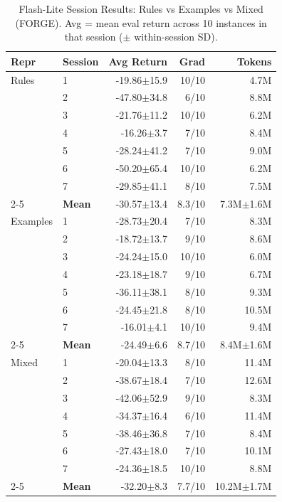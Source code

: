 \documentclass[sigconf]{acmart}
\begin{document}
\begin{table}[htbp]
\centering
\scriptsize
\caption{Flash-Lite Session Results: Rules vs Examples vs Mixed (FORGE).
Avg = mean eval return across 10 instances in that session ($\pm$ within-session SD).}
\label{tab:flash-lite-7run}
\begin{tabular}{ll rrr}
\toprule
\textbf{Repr} & \textbf{Session} & \textbf{Avg Return} & \textbf{Grad} & \textbf{Tokens} \\
\midrule
Rules & 1 & -19.86$\pm$15.9 & 10/10 & 4.7M \\
 & 2 & -47.80$\pm$34.8 & 6/10 & 8.8M \\
 & 3 & -21.76$\pm$11.2 & 10/10 & 6.2M \\
 & 4 & -16.26$\pm$3.7 & 7/10 & 8.4M \\
 & 5 & -28.24$\pm$41.2 & 7/10 & 9.0M \\
 & 6 & -50.20$\pm$65.4 & 10/10 & 6.2M \\
 & 7 & -29.85$\pm$41.1 & 8/10 & 7.5M \\
\cmidrule(lr){2-5}
 & \textbf{Mean} & -30.57$\pm$13.4 & 8.3/10 & 7.3M$\pm$1.6M \\
\midrule
Examples & 1 & -28.73$\pm$20.4 & 7/10 & 8.3M \\
 & 2 & -18.72$\pm$13.7 & 9/10 & 8.6M \\
 & 3 & -24.24$\pm$15.0 & 10/10 & 6.0M \\
 & 4 & -23.18$\pm$18.7 & 9/10 & 6.7M \\
 & 5 & -36.11$\pm$38.1 & 8/10 & 9.3M \\
 & 6 & -24.45$\pm$21.8 & 8/10 & 10.5M \\
 & 7 & -16.01$\pm$4.1 & 10/10 & 9.4M \\
\cmidrule(lr){2-5}
 & \textbf{Mean} & -24.49$\pm$6.6 & 8.7/10 & 8.4M$\pm$1.6M \\
\midrule
Mixed & 1 & -20.04$\pm$13.3 & 8/10 & 11.4M \\
 & 2 & -38.67$\pm$18.4 & 7/10 & 12.6M \\
 & 3 & -42.06$\pm$52.9 & 9/10 & 8.3M \\
 & 4 & -34.37$\pm$16.4 & 6/10 & 11.4M \\
 & 5 & -38.46$\pm$36.8 & 7/10 & 8.4M \\
 & 6 & -27.43$\pm$18.0 & 7/10 & 10.1M \\
 & 7 & -24.36$\pm$18.5 & 10/10 & 8.8M \\
\cmidrule(lr){2-5}
 & \textbf{Mean} & -32.20$\pm$8.3 & 7.7/10 & 10.2M$\pm$1.7M \\
\bottomrule
\end{tabular}
\end{table}
\end{document}
